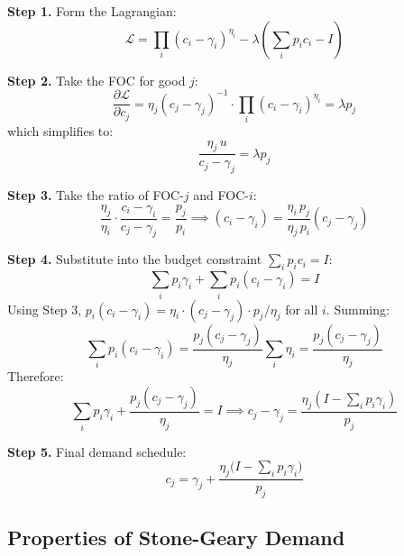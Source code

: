 \documentclass[a4paper,11pt]{article}
\begin{document}
\begin{derivationbox}[title={Step-by-Step Demand Derivation}]

\textbf{Step 1.} Form the Lagrangian:
\[
\mathcal{L} = \prod_{i} (c_i - \gamma_i)^{\eta_i} - \lambda \!\left(\sum_i p_i c_i - I\right)
\]

\textbf{Step 2.} Take the FOC for good $j$:
\[
\frac{\partial \mathcal{L}}{\partial c_j} = \eta_j (c_j - \gamma_j)^{-1} \cdot \prod_i (c_i - \gamma_i)^{\eta_i} = \lambda p_j
\]
which simplifies to:
\[
\frac{\eta_j\, u}{c_j - \gamma_j} = \lambda p_j \tag{FOC-$j$}
\]

\textbf{Step 3.} Take the ratio of FOC-$j$ and FOC-$i$:
\[
\frac{\eta_j}{\eta_i} \cdot \frac{c_i - \gamma_i}{c_j - \gamma_j} = \frac{p_j}{p_i}
\implies (c_i - \gamma_i) = \frac{\eta_i\, p_j}{\eta_j\, p_i}(c_j - \gamma_j)
\]

\textbf{Step 4.} Substitute into the budget constraint $\sum_i p_i c_i = I$:
\[
\sum_i p_i \gamma_i + \sum_i p_i (c_i - \gamma_i) = I
\]
Using Step 3, $p_i(c_i - \gamma_i) = \eta_i \cdot (c_j - \gamma_j) \cdot p_j / \eta_j$ for all $i$. Summing:
\[
\sum_i p_i (c_i - \gamma_i) = \frac{p_j(c_j - \gamma_j)}{\eta_j} \sum_i \eta_i = \frac{p_j(c_j - \gamma_j)}{\eta_j}
\]
Therefore:
\[
\sum_i p_i \gamma_i + \frac{p_j(c_j - \gamma_j)}{\eta_j} = I
\implies c_j - \gamma_j = \frac{\eta_j (I - \sum_i p_i \gamma_i)}{p_j}
\]

\textbf{Step 5.} Final demand schedule:
\[
\boxed{c_j = \gamma_j + \frac{\eta_j \bigl(I - \sum_i p_i \gamma_i\bigr)}{p_j}}
\tag{Demand}
\]

\end{derivationbox}

\subsection*{Properties of Stone-Geary Demand}
\end{document}
